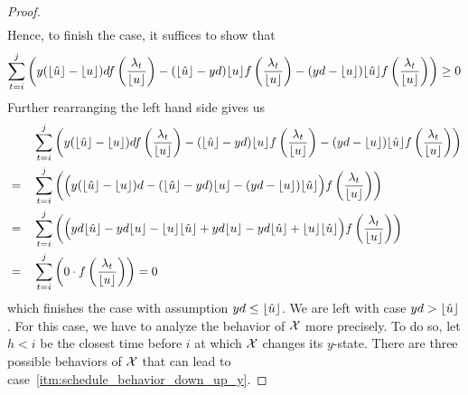 \begin{proof}
\begin{align*}
\end{align*}
Hence, to finish the case, it suffices to show that
\begin{align*}
	\sum\limits_{t=i}^j\left(y(\lfloor\hat{u}\rfloor-\lfloor u\rfloor)df\left(\frac{\lambda_t}{\lfloor u\rfloor}\right)-(\lfloor\hat{u}\rfloor-yd)\lfloor u\rfloor f\left(\frac{\lambda_t}{\lfloor u\rfloor}\right)-(yd-\lfloor u\rfloor)\lfloor\hat{u}\rfloor f\left(\frac{\lambda_t}{\lfloor u\rfloor}\right)\right)\ge 0
\end{align*}
Further rearranging the left hand side gives us
\begin{align*}
	&&&\sum\limits_{t=i}^j\left(y(\lfloor\hat{u}\rfloor-\lfloor u\rfloor)df\left(\frac{\lambda_t}{\lfloor u\rfloor}\right)-(\lfloor\hat{u}\rfloor-yd)\lfloor u\rfloor f\left(\frac{\lambda_t}{\lfloor u\rfloor}\right)-(yd-\lfloor u\rfloor)\lfloor\hat{u}\rfloor f\left(\frac{\lambda_t}{\lfloor u\rfloor}\right)\right)\\
	&=&&\sum\limits_{t=i}^j\left(\Bigl(y(\lfloor\hat{u}\rfloor-\lfloor u\rfloor)d-(\lfloor\hat{u}\rfloor-yd)\lfloor u\rfloor-(yd-\lfloor u\rfloor)\lfloor\hat{u}\rfloor\Bigr)f\left(\frac{\lambda_t}{\lfloor u\rfloor}\right)\right)\\
	&=&&\sum\limits_{t=i}^j\left(\Bigl(yd\lfloor\hat{u}\rfloor-yd\lfloor u\rfloor-\lfloor u\rfloor\lfloor\hat{u}\rfloor+yd\lfloor u\rfloor-yd\lfloor\hat{u}\rfloor+\lfloor u\rfloor\lfloor\hat{u}\rfloor\Bigr)f\left(\frac{\lambda_t}{\lfloor u\rfloor}\right)\right)\\
	&=&&\sum\limits_{t=i}^j\left(0\cdot f\left(\frac{\lambda_t}{\lfloor u\rfloor}\right)\right)=0
\end{align*}
which finishes the case with assumption $yd\le\lfloor\hat{u}\rfloor$. We are left with case $yd>\lfloor\hat{u}\rfloor$. For this case, we have to analyze the behavior of $\mathcal{X}$ more precisely. To do so, let $h<i$ be the closest time before $i$ at which $\mathcal{X}$ changes its $y$-state. There are three possible behaviors of $\mathcal{X}$ that can lead to case~\ref{itm:schedule_behavior_down_up_y}.


\end{proof}
